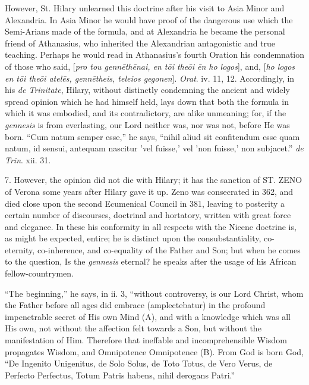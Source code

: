 However, St. Hilary unlearned this doctrine after his visit to Asia
Minor and Alexandria. In Asia Minor he would have proof of the
dangerous use which the Semi-Arians made of the formula, and at
Alexandria he became the personal friend of Athanasius, who inherited
the Alexandrian antagonistic and true teaching. Perhaps he would
read in Athanasius's fourth Oration his condemnation of those who
said, [\emph{pro tou genn\={e}th\={e}nai, en t\={o}i the\={o}i
\={e}n ho logos}], and, [\emph{ho logos en t\={o}i the\={o}i
atel\={e}s, genn\={e}theis, teleios gegonen}]. \emph{Orat}.
iv. 11, 12. Accordingly, in his \emph{de Trinitate}, Hilary, without
distinctly condemning the ancient and widely spread opinion which he
had himself held, lays down that both the formula in which it was
embodied, and its contradictory, are alike unmeaning; for, if the \emph{gennesis}
is from everlasting, our Lord neither was, nor was not, before He was
born. ``Cum natum semper esse,'' he says, ``nihil aliud
sit confitendum esse quam natum, id sensui, antequam nascitur 'vel
fuisse,' vel 'non fuisse,' non subjacet.'' \emph{de Trin}. xii.
31.

7. However, the opinion did not die with Hilary; it has the
sanction of ST. ZENO of
Verona some years after Hilary gave it up. Zeno was consecrated in
362, and died close upon the second Ecumenical Council in 381, leaving
to posterity a certain number of discourses, doctrinal and hortatory,
written with great force and elegance. In these his conformity in all
respects with the Nicene doctrine is, as might be expected, entire; he
is distinct upon the consubstantiality, co-eternity, co-inherence, and
co-equality of the Father and Son; but when he comes to the question,
Is the \emph{gennesis} eternal? he speaks after the usage of his
African fellow-countrymen.

``The beginning,'' he says, in ii. 3, ``without
controversy, is our Lord Christ, whom the Father before all ages did
embrace (amplectebatur) in the profound impenetrable secret of His own
Mind (A), and with a knowledge which was all His own, not
without the affection felt towards a Son, but without the
manifestation of Him. Therefore that ineffable and incomprehensible
Wisdom propagates Wisdom, and Omnipotence Omnipotence (B). From God is
born God, ``De Ingenito Unigenitus, de Solo Solus, de Toto Totus,
de Vero Verus, de Perfecto Perfectus, Totum Patris habens, nihil
derogans Patri.''

